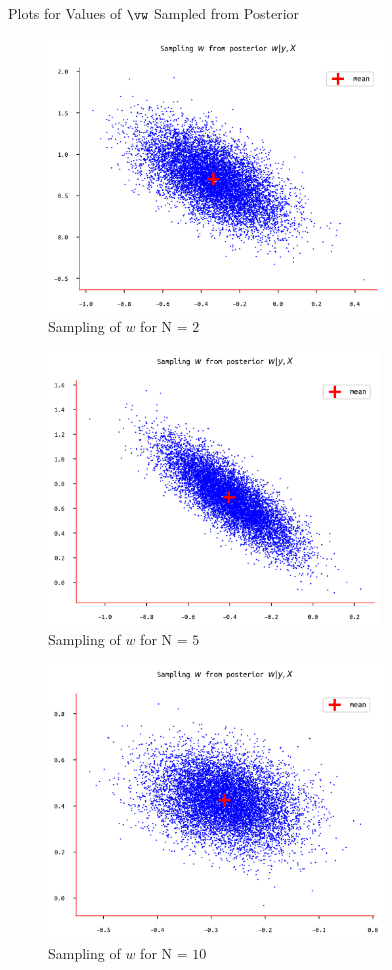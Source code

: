 \documentclass{article}
\begin{document}
\begin{question}
\begin{qsection}{Plots for Values of $\vw$ Sampled from Posterior}
		\begin{figure}[h!]
			\centering
			\includegraphics[height=275px]{includes/plots/q4b/posterior-samples-2.png}
			\caption{Sampling of $w$ for N = $2$}
		\end{figure}

		\begin{figure}[h!]
			\centering
			\includegraphics[height=275px]{includes/plots/q4b/posterior-samples-3.png}
			\caption{Sampling of $w$ for N = $5$}
		\end{figure}

		\begin{figure}[h!]
			\centering
			\includegraphics[height=275px]{includes/plots/q4b/posterior-samples-4.png}
			\caption{Sampling of $w$ for N = $10$}
		\end{figure}


\end{qsection}
\end{question}
\end{document}
